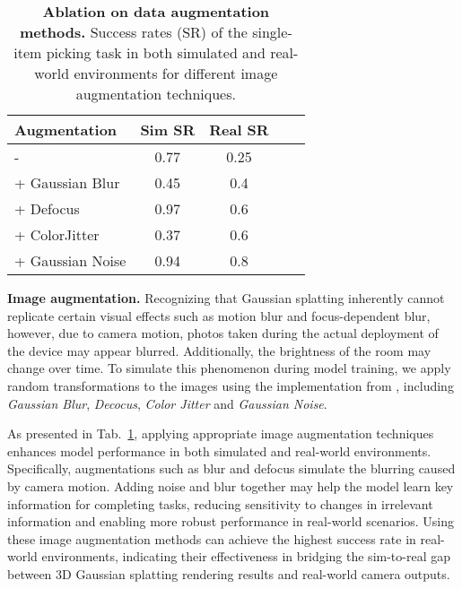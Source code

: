 \begin{table}[t]
    \caption{\textbf{Ablation on data augmentation methods.} Success rates (SR) of the single-item picking task in both simulated and real-world environments for different image augmentation techniques.}
    \label{tab:augmentation_comparison}
    \centering
    \begin{tabular}{lcccc}
    \toprule
        Augmentation & Sim SR & Real SR \\ \midrule
        -  & 0.77 & 0.25 \\
        + Gaussian Blur & 0.45 & 0.4 \\
        + Defocus & 0.97 & 0.6 \\
        + ColorJitter & 0.37 & 0.6 \\
        + Gaussian Noise & 0.94 & 0.8\* \\
        \bottomrule
    \end{tabular}
\end{table}


\noindent\textbf{Image augmentation.} Recognizing that Gaussian splatting inherently cannot replicate certain visual effects such as motion blur and focus-dependent blur, however, due to camera motion, photos taken during the actual deployment of the device may appear blurred. Additionally, the brightness of the room may change over time. To simulate this phenomenon during model training,
we apply random transformations to the images using the implementation from \cite{albumentations}, including \textit{Gaussian Blur}, \textit{Decocus}, \textit{Color Jitter} and \textit{Gaussian Noise}.

As presented in Tab.~\ref{tab:augmentation_comparison}, applying appropriate image augmentation techniques enhances model performance in both simulated and real-world environments. Specifically, augmentations such as blur and defocus simulate the blurring caused by camera motion. Adding noise and blur together may help the model learn key information for completing tasks, reducing sensitivity to changes in irrelevant information and enabling more robust performance in real-world scenarios. Using these image augmentation methods can achieve the highest success rate in real-world environments, indicating their effectiveness in bridging the sim-to-real gap between 3D Gaussian splatting rendering results and real-world camera outputs.

